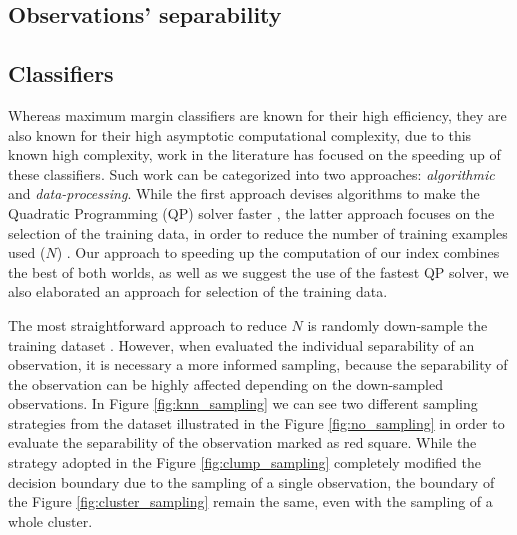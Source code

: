 \begin{figure}[h!]
\qquad
{}
\qquad
{}
\caption{}
\label{fig:approx_trap}
\end{figure}



\subsection{Observations' separability}

\subsection{Classifiers}
Whereas maximum margin classifiers are known for their high efficiency, they are also known for their high asymptotic computational complexity, due to this known high complexity, work in the literature has focused on the speeding up of these classifiers. Such work can be categorized into two approaches: \textit{algorithmic} and \textit{data-processing}. While the first approach devises algorithms to make the Quadratic Programming (QP) solver faster \cite{platt1998, keerthi2005}, the latter approach focuses on the selection of the training data, in order to reduce the number of training examples used ($N$) \cite{lee2001,panda2006}. Our approach to speeding up the computation of our index combines the best of both worlds, as well as we suggest the use of the fastest QP solver, we also elaborated an approach for selection of the training data.

The most straightforward approach to reduce $N$ is randomly down-sample the training dataset \cite{lee2001}. However, when evaluated the individual separability of an observation, it is necessary a more informed sampling, because the separability of the observation can be highly affected depending on the down-sampled observations. In Figure \ref{fig:knn_sampling} we can see two different sampling strategies from the dataset illustrated in the Figure \ref{fig:no_sampling} in order to evaluate the separability of the observation marked as red square. While the strategy adopted in the Figure \ref{fig:clump_sampling} completely modified the decision boundary due to the sampling of a single observation, the boundary of the Figure \ref{fig:cluster_sampling} remain the same, even with the sampling of a whole cluster.

